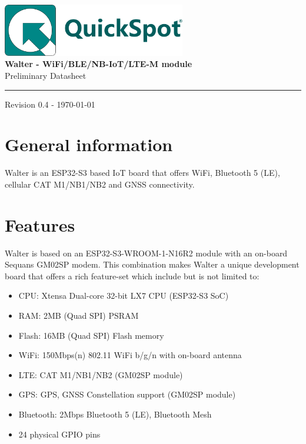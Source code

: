 \documentclass[11pt]{article}
\newcommand{\dptproduct}{Walter - WiFi/BLE/NB-IoT/LTE-M module}
\begin{document}
\begin{titlepage}
\hfill\includegraphics[width=8cm]{logo.pdf}\\

\hfill {\bf \Large  \dptproduct}\\[-3mm]

\hfill {\Large Preliminary Datasheet}

\vfill
\rule{487pt}{1pt}

\hfill Revision 0.4 - \today
\end{titlepage}
\section{General information}
Walter is an ESP32-S3 based IoT board that offers WiFi, Bluetooth 5 (LE), cellular CAT M1/NB1/NB2 and GNSS connectivity. 

\section{Features}
Walter is based on an ESP32-S3-WROOM-1-N16R2 module with an on-board Sequans GM02SP modem.
This combination makes Walter a unique development board that offers a rich feature-set which include but is not limited to:
\begin{itemize}
	\item CPU: Xtensa Dual-core 32-bit LX7 CPU (ESP32-S3 SoC)
	\item RAM: 2MB (Quad SPI) PSRAM
	\item Flash: 16MB (Quad SPI) Flash memory
	\item WiFi: 150Mbps(n) 802.11 WiFi b/g/n with on-board antenna
	\item LTE: CAT M1/NB1/NB2 (GM02SP module)
	\item GPS: GPS, GNSS Constellation support (GM02SP module)
	\item Bluetooth: 2Mbps Bluetooth 5 (LE), Bluetooth Mesh
	\item 24 physical GPIO pins 
\end{itemize}
\end{document}
